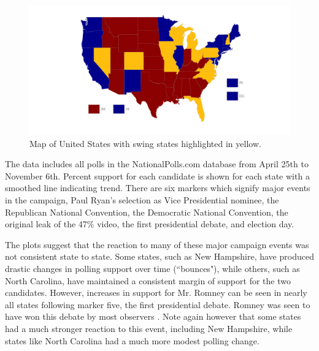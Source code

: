 \documentclass[11pt]{article}\usepackage{graphicx, color}
\newenvironment{knitrout}{}{} %
\begin{document}
\begin{knitrout}
\color{fgcolor}\begin{figure}[H]


{\centering \includegraphics[width=\textwidth]{figure/swing_map} 

}

\caption[Map of United States with swing states highlighted in yellow]{Map of United States with swing states highlighted in yellow.\label{fig:swing_map}}
\end{figure}


\end{knitrout}


The data includes all polls in the NationalPolls.com database from April 25th to November 6th. Percent support for each candidate is shown for each state with a smoothed line indicating trend. There are six markers which signify major events in the campaign, Paul Ryan's selection as Vice Presidential nominee, the Republican National Convention, the Democratic National Convention, the original leak of the 47\% video, the first presidential debate, and election day.

The plots suggest that the reaction to many of these major campaign events was not consistent state to state. Some states, such as New Hampshire, have produced drastic changes in polling support over time (``bounces"), while others, such as North Carolina, have maintained a consistent margin of support for the two candidates. However, increases in support for Mr. Romney can be seen in nearly all states following marker five, the first presidential debate. Romney was seen to have won this debate by most observers \cite{jj-debate}. Note again however that some states had a much stronger reaction to this event, including New Hampshire, while states like North Carolina had a much more modest polling change.
\end{document}
